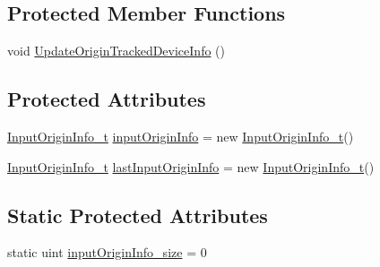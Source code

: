 \subsection*{Protected Member Functions}
\begin{DoxyCompactItemize}
\item 
void \mbox{\hyperlink{class_valve_1_1_v_r_1_1_steam_v_r___action___in___source_a2f6dd3258b69ad2d7907dd35460ed4d9}{Update\+Origin\+Tracked\+Device\+Info}} ()
\end{DoxyCompactItemize}
\subsection*{Protected Attributes}
\begin{DoxyCompactItemize}
\item 
\mbox{\hyperlink{struct_valve_1_1_v_r_1_1_input_origin_info__t}{Input\+Origin\+Info\+\_\+t}} \mbox{\hyperlink{class_valve_1_1_v_r_1_1_steam_v_r___action___in___source_aa4f8d3bdc1f308d2687e52f56b4c4dfe}{input\+Origin\+Info}} = new \mbox{\hyperlink{struct_valve_1_1_v_r_1_1_input_origin_info__t}{Input\+Origin\+Info\+\_\+t}}()
\item 
\mbox{\hyperlink{struct_valve_1_1_v_r_1_1_input_origin_info__t}{Input\+Origin\+Info\+\_\+t}} \mbox{\hyperlink{class_valve_1_1_v_r_1_1_steam_v_r___action___in___source_a307619ed4e0665f3996d46e3eab92c7c}{last\+Input\+Origin\+Info}} = new \mbox{\hyperlink{struct_valve_1_1_v_r_1_1_input_origin_info__t}{Input\+Origin\+Info\+\_\+t}}()
\end{DoxyCompactItemize}
\subsection*{Static Protected Attributes}
\begin{DoxyCompactItemize}
\item 
static uint \mbox{\hyperlink{class_valve_1_1_v_r_1_1_steam_v_r___action___in___source_a192b33ca9612e42e4180374bdfba5c14}{input\+Origin\+Info\+\_\+size}} = 0
\end{DoxyCompactItemize}
